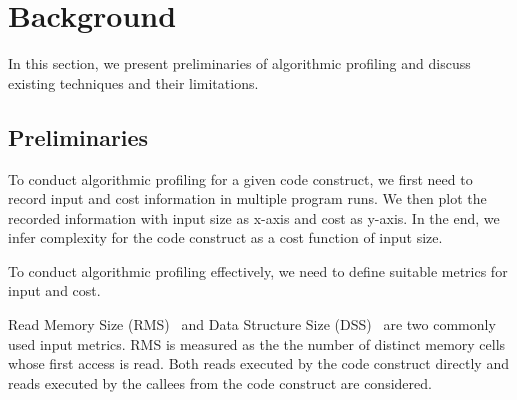 
\section{Background}
\label{sec:back}

In this section, we present preliminaries of 
algorithmic profiling and discuss existing techniques and their
limitations. 


\subsection{Preliminaries}
\label{subsec:pre}

To conduct algorithmic profiling for a given code construct,
we first need to record input and cost information in multiple program runs. 
We then plot the recorded information with input size as x-axis and cost as y-axis.
In the end, we infer complexity for the code construct as a cost function of input size. 

To conduct algorithmic profiling effectively, 
we need to define suitable metrics for input and cost. 

%


Read Memory Size (RMS)~\citep{Aprof1,Aprof2}  and Data Structure Size (DSS)~\citep{AlgoProf} 
are two commonly used input metrics. 
RMS is measured as the the number of distinct memory cells 
whose first access is read. Both reads executed by the code 
construct directly and  reads executed by the callees from 
the code construct are considered. 


